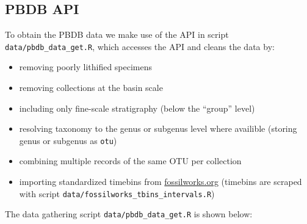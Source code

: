 \documentclass[]{article}
\providecommand{\tightlist}{%
  \setlength{\itemsep}{0pt}\setlength{\parskip}{0pt}}
\begin{document}
\subsection{PBDB API}\label{pbdb-api}

To obtain the PBDB data we make use of the API in script
\texttt{data/pbdb\_data\_get.R}, which accesses the API and cleans the
data by:

\begin{itemize}
\tightlist
\item
  removing poorly lithified specimens
\item
  removing collections at the basin scale
\item
  including only fine-scale stratigraphy (below the ``group'' level)
\item
  resolving taxonomy to the genus or subgenus level where availible
  (storing genus or subgenus as \texttt{otu})
\item
  combining multiple records of the same OTU per collection
\item
  importing standardized timebins from \url{fossilworks.org} (timebins
  are scraped with script \texttt{data/fossilworks\_tbins\_intervals.R})
\end{itemize}

The data gathering script \texttt{data/pbdb\_data\_get.R} is shown
below:
\end{document}
